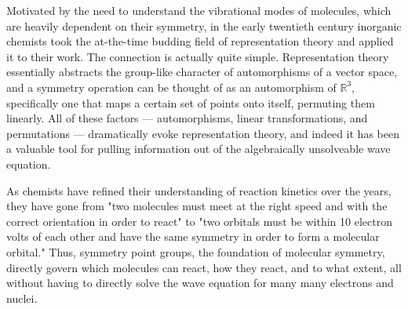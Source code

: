 \documentclass[openany, amssymb, psamsfonts]{amsart}
\theoremstyle{definition}
\numberwithin{equation}{section}
\begin{document}
Motivated by the need to understand the vibrational modes of molecules, which are heavily dependent on their symmetry, in the early twentieth century inorganic chemists took the at-the-time budding field of representation theory and applied it to their work. The connection is actually quite simple. Representation theory essentially abstracts the group-like character of automorphisms of a vector space, and a symmetry operation can be thought of as an automorphism of $\mathbb{R}^3$, specifically one that maps a certain set of points onto itself, permuting them linearly. All of these factors --- automorphisms, linear transformations, and permutations --- dramatically evoke representation theory, and indeed it has been a valuable tool for pulling information out of the algebraically unsolveable wave equation.\par
As chemists have refined their understanding of reaction kinetics over the years, they have gone from "two molecules must meet at the right speed and with the correct orientation in order to react" to "two orbitals must be within 10 electron volts of each other and have the same symmetry in order to form a molecular orbital." Thus, symmetry point groups, the foundation of molecular symmetry, directly govern which molecules can react, how they react, and to what extent, all without having to directly solve the wave equation for many many electrons and nuclei.\par
\begin{center}
\end{center}
\end{document}
